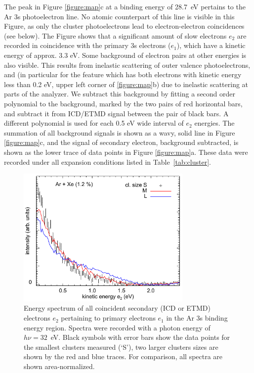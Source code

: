 The peak in Figure \ref{figure:map}c at a binding energy of 28.7~eV pertains to the Ar 3s photoelectron line.
No atomic counterpart of this line is visible in this Figure, as only the cluster photoelectrons lead to electron-electron coincidences (see below).
The Figure shows that a significant amount of slow electrons $e_2$ are recorded in coincidence with the primary 3s electrons ($e_1$), which have a kinetic energy of approx. 3.3 eV. 
Some background of electron pairs at other energies is also visible.
This results from inelastic scattering of outer valence photoelectrons, and (in particular for the feature which has both electrons with kinetic energy less than 0.2 eV, upper left corner of \ref{figure:map}b) due to inelastic scattering at parts of the analyzer.
We subtract this background by fitting a second order polynomial to the background, marked by the two pairs of red horizontal bars, and subtract it from ICD/ETMD signal between the pair of black bars.
A different polynomial is used for each 0.5 eV wide interval of $e_2$ energies.
The summation of all background signals is shown as a wavy, solid line in Figure \ref{figure:map}c, and the signal of secondary electron, background subtracted, is shown as the lower trace of data points in Figure \ref{figure:map}a.
These data were recorded under all expansion conditions listed in Table\ \ref{tab:cluster}.

\begin{figure}[ht]
 \centering
 \includegraphics[width=8.5cm]{pics/figure_icd_12.pdf}
 \caption{
Energy spectrum of all coincident secondary (ICD or ETMD) electrons $e_2$ pertaining to primary electrons $e_1$ in the Ar 3s binding energy region. Spectra were recorded with a photon energy of $h\nu = 32$~eV. Black symbols with error bars show the data points for the smallest clusters measured (`S'), two larger clusters sizes are shown by the red and blue traces. For comparison, all spectra are shown area-normalized. 
}
 \label{figure:icd_12}
\end{figure}


